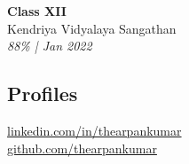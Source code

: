 \documentclass[10pt,a4paper]{article}
\begin{document}
\begin{minipage}[t]{0.3\textwidth}
    \textbf{Class XII} \\
    Kendriya Vidyalaya Sangathan \\
    \textit{88\% | Jan 2022}
    \vspace{10pt}

    \subsection*{Profiles}
    \faLinkedin\hspace{4pt} \href{https://www.linkedin.com/in/thearpankumar}{linkedin.com/in/thearpankumar} \\
    \vspace{4pt}
    \faGithub\hspace{4pt} \href{https://github.com/thearpankumar}{github.com/thearpankumar}

\end{minipage}
\hspace{0.05\textwidth} %
\end{document}
